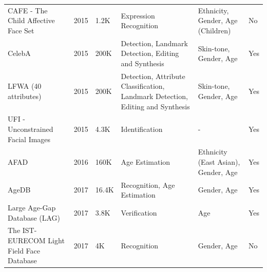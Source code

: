 \documentclass[journal]{IEEEtran}
\begin{document}
\begin{table}[!t]
\begin{tabular}{|p{}|C{0.025\textwidth}|C{0.09\textwidth}|p{0.19\textwidth}|p{0.2\textwidth}|C{0.06\textwidth}|}
CAFE - The Child Affective Face Set \cite{lobue2015child}                               & 2015          & 1.2K                        & Expression Recognition                                                         & Ethnicity, Gender, Age (Children)                   & No                     \\
CelebA \cite{liu2015deep}                                                               & 2015          & 200K                        & Detection, Landmark Detection, Editing and Synthesis                           & Skin-tone, Gender, Age                              & Yes                    \\
LFWA \cite{liu2015deep} (40 attributes)                                                              & 2015          & 200K                        & Detection, Attribute Classification, Landmark Detection, Editing and Synthesis & Skin-tone, Gender, Age                              & Yes                    \\
UFI - Unconstrained Facial Images \cite{lenc2015unconstrained}                          & 2015          & 4.3K                        & Identification                                                                 & -                                                   & Yes                    \\
AFAD \cite{niu2016ordinal}                                                              & 2016          & 160K                        & Age Estimation                                                                 & Ethnicity (East Asian), Gender, Age                 & Yes                    \\
AgeDB \cite{moschoglou2017agedb}                                                        & 2017          & 16.4K                       & Recognition, Age Estimation                                                    & Gender, Age                                         & Yes                    \\
Large Age-Gap Database (LAG) \cite{bianco2017large}                                     & 2017          & 3.8K                        & Verification                                                                   & Age                                                 & Yes                    \\
The IST-EURECOM Light Field Face Database \cite{sepas2017eurecom}                       & 2017          & 4K                          & Recognition                                                                    & Gender, Age                                         & No                     \\

\end{tabular}
\end{table}
\end{document}
